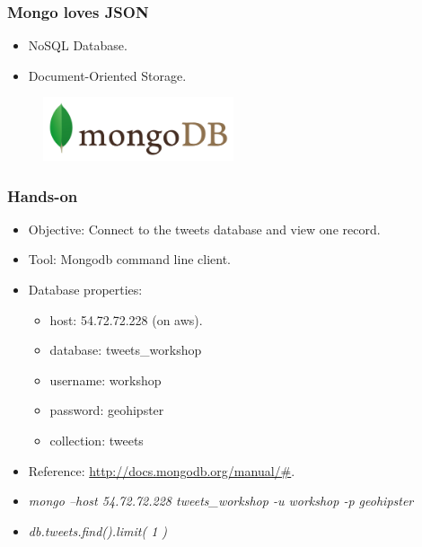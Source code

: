 \documentclass[hyperref={pdfpagelabels=true}]{beamer}
\begin{document}
\begin{frame}
\frametitle{Mongo loves JSON}
\begin{itemize}
  \item<1->NoSQL Database.
  \item<1->Document-Oriented Storage.%
\end{itemize}
    \begin{figure}  
      \includegraphics[width=0.5\textwidth]{mongo.png}  
    \end{figure}  
\end{frame}


\begin{frame}
\frametitle{Hands-on}
\begin{itemize}
  \item<1->Objective: Connect to the tweets database and view one record.
  \item<2->Tool: Mongodb command line client.
  \item<2->Database properties:
  \begin{itemize}  
    \item<2->host: 54.72.72.228 (on aws).
    \item<2->database: tweets\_workshop
    \item<2->username: workshop
    \item<2->password: geohipster
    \item<2->collection: tweets    
  \end{itemize}  
  \item<2->Reference: \url{http://docs.mongodb.org/manual/\#}.
  \item<3-> \textit{mongo --host 54.72.72.228 tweets\_workshop -u workshop -p geohipster}
  \item<3->\textit{db.tweets.find().limit( 1 )}  
\end{itemize}  
\end{frame}
\end{document}
